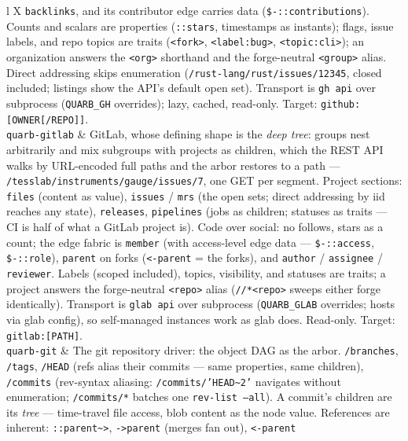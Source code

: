 \documentclass{report}
\begin{document}
\begin{xltabular}{\textwidth}{l X}
  \texttt{backlinks}, and its contributor edge carries data
  (\texttt{\$-::contributions}). Counts and scalars are
  properties (\texttt{::stars}, timestamps as instants); flags,
  issue labels, and repo topics are traits (\texttt{<fork>},
  \texttt{<label:bug>}, \texttt{<topic:cli>}); an organization answers the
  \texttt{<org>} shorthand and the forge-neutral
  \texttt{<group>} alias. Direct addressing skips
  enumeration (\texttt{/rust-lang/rust/issues/12345}, closed
  included; listings show the API's default open set).
  Transport is \texttt{gh api} over subprocess
  (\texttt{QUARB\_GH} overrides); lazy, cached, read-only.
  Target: \texttt{github:[OWNER[/REPO]]}. \\
\texttt{quarb-gitlab} & GitLab, whose defining shape is the
  \emph{deep tree}: groups nest arbitrarily and mix subgroups
  with projects as children, which the REST API walks by
  URL-encoded full paths and the arbor restores to a path —
  \texttt{/tesslab/instruments/gauge/issues/7}, one GET per
  segment. Project sections: \texttt{files} (content as value),
  \texttt{issues} / \texttt{mrs} (the open sets; direct
  addressing by iid reaches any state), \texttt{releases},
  \texttt{pipelines} (jobs as children; statuses as traits —
  CI is half of what a GitLab project is). Code over social:
  no follows, stars as a count; the edge fabric is
  \texttt{member} (with access-level edge data —
  \texttt{\$-::access}, \texttt{\$-::role}), \texttt{parent} on
  forks (\texttt{<-parent} = the forks), and \texttt{author} /
  \texttt{assignee} / \texttt{reviewer}. Labels (scoped
  included), topics, visibility, and statuses are traits; a
  project answers the forge-neutral \texttt{<repo>} alias
  (\texttt{//*<repo>} sweeps either forge identically).
  Transport is \texttt{glab api} over subprocess
  (\texttt{QUARB\_GLAB} overrides; hosts via glab config), so
  self-managed instances work as glab does. Read-only. Target:
  \texttt{gitlab:[PATH]}. \\
\texttt{quarb-git} & The git repository driver: the object
  DAG as the arbor. \texttt{/branches}, \texttt{/tags},
  \texttt{/HEAD} (refs alias their commits — same properties,
  same children), \texttt{/commits} (rev-syntax aliasing:
  \texttt{/commits/'HEAD\textasciitilde2'} navigates without
  enumeration; \texttt{/commits/*} batches one
  \texttt{rev-list --all}). A commit's children are its
  \emph{tree} — time-travel file access, blob content as the
  node value. References are inherent:
  \texttt{::parent\textasciitilde>},
  \texttt{->parent} (merges fan out), \texttt{<-parent}

\end{xltabular}
\end{document}
